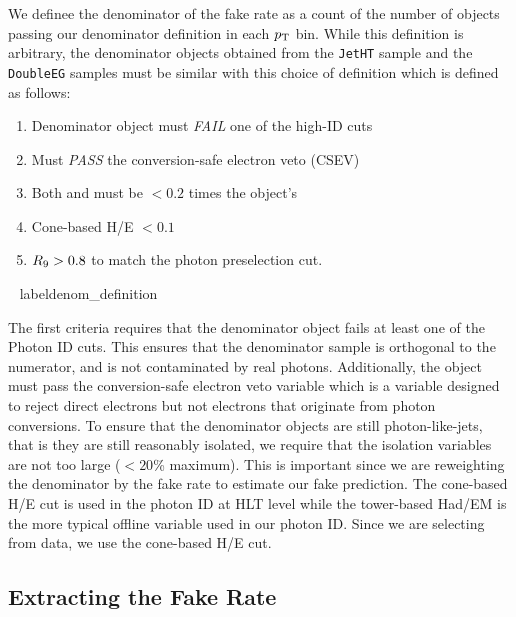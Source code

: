 We definee the denominator of the fake rate as a count of the number of objects passing our denominator definition in each $p_{\mathrm{T}}$ bin. While this definition is arbitrary, the denominator objects obtained from the \texttt{JetHT} sample and the \texttt{DoubleEG} samples must be similar with this choice of definition which is defined as follows:
\begin{enumerate}
    \item Denominator object must \emph{FAIL} one of the high-\pt ID cuts
    \item Must \emph{PASS} the conversion-safe electron veto (CSEV)
    \item Both \chiso and \corphoiso must be $< 0.2$ times the object's \pt
    \item Cone-based H/E $< 0.1$ 
    \item $R_\mathrm{9}>0.8$ to match the photon preselection cut.
\end{enumerate}~ label{denom_definition}

The first criteria requires that the denominator object fails at least one of the Photon ID cuts. This ensures that the denominator sample is orthogonal to the numerator, and is not contaminated by real photons. Additionally, the object must pass the conversion-safe electron veto variable which is a variable designed to reject direct electrons but not electrons that originate from photon conversions. To ensure that the denominator objects are still photon-like-jets, that is they are still reasonably isolated, we require that the isolation variables are not too large ($<20$\% maximum). This is important since we are reweighting the denominator by the fake rate to estimate our fake prediction. The cone-based H/E cut is used in the photon ID at HLT level while the tower-based Had/EM is the more typical offline variable used in our photon ID. Since we are selecting from data, we use the cone-based H/E cut. 


\subsection{Extracting the Fake Rate}

